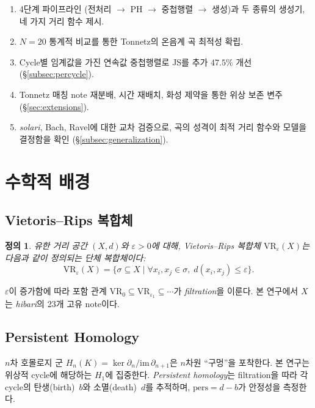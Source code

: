 \documentclass[11pt,a4paper]{article}
\newtheorem{definition}{정의}[section]
\begin{document}
\begin{enumerate}
\item 4단계 파이프라인 (전처리 $\to$ PH $\to$ 중첩행렬
      $\to$ 생성)과 두 종류의 생성기, 네 가지 거리 함수 제시.
\item $N=20$ 통계적 비교를 통한 Tonnetz의 온음계 곡 최적성 확립.
\item Cycle별 임계값을 가진 연속값 중첩행렬로 JS를 추가
      $47.5\%$ 개선 (\S\ref{subsec:percycle}).
\item Tonnetz 매칭 note 재분배, 시간 재배치, 화성 제약을 통한
      위상 보존 변주 (\S\ref{sec:extensions}).
\item \emph{solari}, Bach, Ravel에 대한 교차 검증으로,
      곡의 성격이 최적 거리 함수와 모델을 결정함을 확인
      (\S\ref{subsec:generalization}).
\end{enumerate}


\section{수학적 배경}
\label{sec:background}

\subsection{Vietoris--Rips 복합체}
\label{subsec:vr}

\begin{definition}
유한 거리 공간 $(X, d)$와 $\varepsilon > 0$에 대해,
\emph{Vietoris--Rips 복합체} $\mathrm{VR}_\varepsilon(X)$는
다음과 같이 정의되는 단체 복합체이다:
\[
\mathrm{VR}_\varepsilon(X) = \{\sigma \subseteq X \mid
\forall x_i, x_j \in \sigma,\; d(x_i,x_j) \le \varepsilon\}.
\]
\end{definition}

$\varepsilon$이 증가함에 따라 포함 관계
$\mathrm{VR}_0 \subseteq \mathrm{VR}_{\varepsilon_1} \subseteq \cdots$가
\emph{filtration}을 이룬다. 본 연구에서 $X$는 \emph{hibari}의
23개 고유 note이다.

\subsection{Persistent Homology}
\label{subsec:ph}

$n$차 호몰로지 군 $H_n(K) = \ker\partial_n / \mathrm{im}\,\partial_{n+1}$은
$n$차원 ``구멍''을 포착한다. 본 연구는 위상적 cycle에 해당하는
$H_1$에 집중한다. \emph{Persistent homology}는 filtration을 따라
각 cycle의 탄생(birth)~$b$와 소멸(death)~$d$를 추적하며,
$\mathrm{pers} = d - b$가 안정성을 측정한다.
\end{document}
